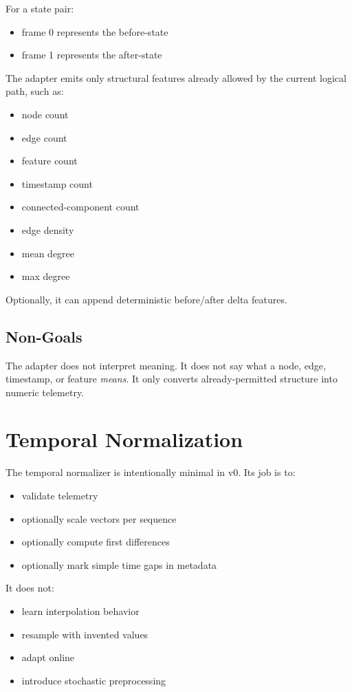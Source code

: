 \documentclass[11pt]{article}
\begin{document}
For a state pair:

\begin{itemize}
\item frame 0 represents the before-state
\item frame 1 represents the after-state
\end{itemize}

The adapter emits only structural features already allowed by the current logical path, such as:

\begin{itemize}
\item node count
\item edge count
\item feature count
\item timestamp count
\item connected-component count
\item edge density
\item mean degree
\item max degree
\end{itemize}

Optionally, it can append deterministic before/after delta features.

\subsection{Non-Goals}

The adapter does not interpret meaning.
It does not say what a node, edge, timestamp, or feature \emph{means}.
It only converts already-permitted structure into numeric telemetry.

\section{Temporal Normalization}

The temporal normalizer is intentionally minimal in v0.
Its job is to:

\begin{itemize}
\item validate telemetry
\item optionally scale vectors per sequence
\item optionally compute first differences
\item optionally mark simple time gaps in metadata
\end{itemize}

It does not:

\begin{itemize}
\item learn interpolation behavior
\item resample with invented values
\item adapt online
\item introduce stochastic preprocessing
\end{itemize}
\end{document}
